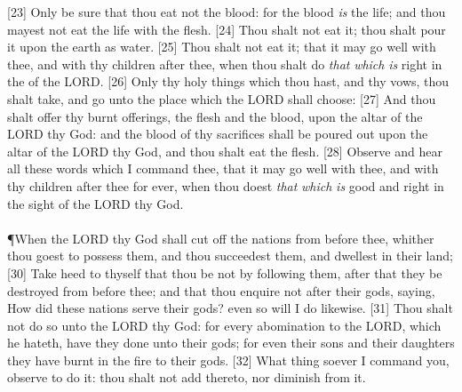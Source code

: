 [23] \textcolor[cmyk]{0.99998,1,0,0}{Only be sure that thou eat not the blood: for the blood \emph{is} the life; and thou mayest not eat the life with the flesh.}
[24] \textcolor[cmyk]{0.99998,1,0,0}{Thou shalt not eat it; thou shalt pour it upon the earth as water.}
[25] \textcolor[cmyk]{0.99998,1,0,0}{Thou shalt not eat it; that it may go well with thee, and with thy children after thee, when thou shalt do \emph{that} \emph{which} \emph{is} right in the  of the LORD.}
[26] \textcolor[cmyk]{0.99998,1,0,0}{Only thy holy things which thou hast, and thy vows, thou shalt take, and go unto the place which the LORD shall choose:}
[27] \textcolor[cmyk]{0.99998,1,0,0}{And thou shalt offer thy burnt offerings, the flesh and the blood, upon the altar of the LORD thy God: and the blood of thy sacrifices shall be poured out upon the altar of the LORD thy God, and thou shalt eat the flesh.}
[28] \textcolor[cmyk]{0.99998,1,0,0}{Observe and hear all these words which I command thee, that it may go well with thee, and with thy children after thee for ever, when thou doest \emph{that} \emph{which} \emph{is} good and right in the sight of the LORD thy God.}\\
\\
\P \textcolor[cmyk]{0.99998,1,0,0}{When the LORD thy God shall cut off the nations from before thee, whither thou goest to possess them, and thou succeedest them, and dwellest in their land;}
[30] \textcolor[cmyk]{0.99998,1,0,0}{Take heed to thyself that thou be not  by following them, after that they be destroyed from before thee; and that thou enquire not after their gods, saying, How did these nations serve their gods? even so will I do likewise.}
[31] \textcolor[cmyk]{0.99998,1,0,0}{Thou shalt not do so unto the LORD thy God: for every abomination to the LORD, which he hateth, have they done unto their gods; for even their sons and their daughters they have burnt in the fire to their gods.}
[32] \textcolor[cmyk]{0.99998,1,0,0}{What thing soever I command you, observe to do it: thou shalt not add thereto, nor diminish from it.}